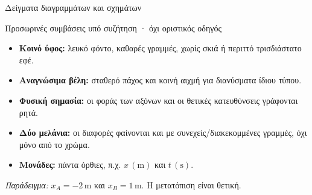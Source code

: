 \setcounter{chapter}{1}
\thispagestyle{plain}
\begin{center}
{\BookHeadingFont\color{BookPrimary}\fontsize{17}{22}\selectfont Δείγματα διαγραμμάτων και σχημάτων}\par
\smallskip
{\color{BookInk}\small Προσωρινές συμβάσεις υπό συζήτηση · όχι οριστικός οδηγός}
\end{center}
\begin{itemize}
\item \textbf{Κοινό ύφος:} λευκό φόντο, καθαρές γραμμές, χωρίς σκιά ή περιττό τρισδιάστατο εφέ.
\item \textbf{Αναγνώσιμα βέλη:} σταθερό πάχος και κοινή αιχμή για διανύσματα ίδιου τύπου.
\item \textbf{Φυσική σημασία:} οι φοράς των αξόνων και οι θετικές κατευθύνσεις γράφονται ρητά.
\item \textbf{Δύο μελάνια:} οι διαφορές φαίνονται και με συνεχείς/διακεκομμένες γραμμές, όχι μόνο από το χρώμα.
\item \textbf{Μονάδες:} πάντα όρθιες, π.χ. $x\,(\mathrm{m})$ και $t\,(\mathrm{s})$.
\end{itemize}
\noindent\textit{Παράδειγμα:} $x_A=-2\,\mathrm{m}$ και $x_B=1\,\mathrm{m}$. Η μετατόπιση είναι θετική.
\begin{center}
\label{fig:guide-displacement}
\end{center}
